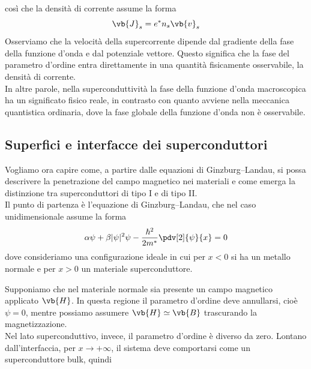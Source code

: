 così che la densità di corrente assume la forma
\begin{equation*}
   \vb{J}_s = e^* n_s \vb{v}_s
\end{equation*}
Osserviamo che la velocità della supercorrente dipende dal gradiente della fase della funzione d'onda e dal potenziale vettore. Questo significa che la fase del parametro d'ordine entra direttamente in una quantità fisicamente osservabile, la densità di corrente.\\
In altre parole, nella superconduttività la fase della funzione d'onda macroscopica ha un significato fisico reale, in contrasto con quanto avviene nella meccanica quantistica ordinaria, dove la fase globale della funzione d'onda non è osservabile.
\subsection{Superfici e interfacce dei superconduttori}
Vogliamo ora capire come, a partire dalle equazioni di Ginzburg--Landau, si possa descrivere la penetrazione del campo magnetico nei materiali e come emerga la distinzione tra superconduttori di tipo I e di tipo II.\\
Il punto di partenza è l'equazione di Ginzburg--Landau, che nel caso unidimensionale assume la forma
\begin{equation}
   \alpha \psi + \beta |\psi|^2 \psi
   - \frac{\hbar^2}{2m^*} \pdv[2]{\psi}{x}
   = 0
   \label{eq:ginzburg_landau_equation_1d}
\end{equation}
dove consideriamo una configurazione ideale in cui per $x<0$ si ha un metallo normale e per $x>0$ un materiale superconduttore.
\begin{figure}[H]
   \centering
\end{figure}
\hspace{-0.6cm}Supponiamo che nel materiale normale sia presente un campo magnetico applicato $\vb{H}$. In questa regione il parametro d'ordine deve annullarsi, cioè $\psi=0$, mentre possiamo assumere $\vb{H}\simeq \vb{B}$ trascurando la magnetizzazione.\\
Nel lato superconduttivo, invece, il parametro d'ordine è diverso da zero. Lontano dall'interfaccia, per $x \to +\infty$, il sistema deve comportarsi come un superconduttore bulk, quindi

